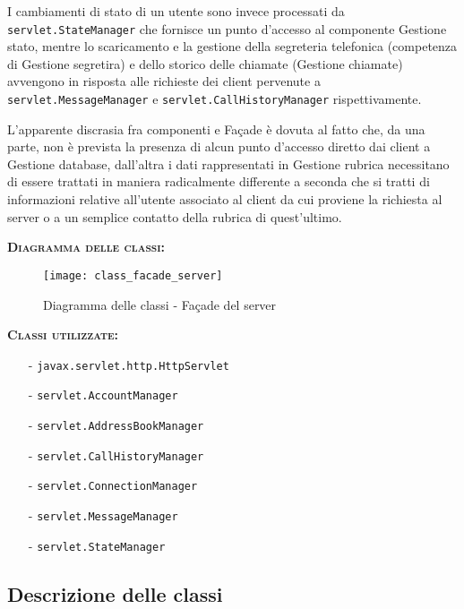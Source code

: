 \begin{description}
I cambiamenti di stato di un utente sono invece processati da \texttt{servlet.StateManager} che fornisce un punto d'accesso al componente \textsf{Gestione stato}, mentre lo scaricamento e la gestione della segreteria telefonica (competenza di \textsf{Gestione segretira}) e dello storico delle chiamate (\textsf{Gestione chiamate}) avvengono in risposta alle richieste dei client pervenute a \texttt{servlet.MessageManager} e \texttt{servlet.CallHistoryManager} rispettivamente.

L'apparente discrasia fra componenti e Façade è dovuta al fatto che, da una parte, non è prevista la presenza di alcun punto d'accesso diretto dai client a \textsf{Gestione database}, dall'altra i dati rappresentati in \textsf{Gestione rubrica} necessitano di essere trattati in maniera radicalmente differente a seconda che si tratti di informazioni relative all'utente associato al client da cui proviene la richiesta al server o a un semplice contatto della rubrica di quest'ultimo.

	\item{\scshape\bfseries Diagramma delle classi:}
\begin{figure}[H]
  \centering
  \texttt{[image: class\_facade\_server]}
  \caption{Diagramma delle classi - Façade del server}\label{fig:facadeserver}
\end{figure}	
	
	\item{\scshape\bfseries Classi utilizzate:}\\
	\begin{itemize}[noitemsep,nolistsep]
	  \item[-] \texttt{javax.servlet.http.HttpServlet}
	  \item[-] \texttt{servlet.AccountManager}
	  \item[-] \texttt{servlet.AddressBookManager}
	  \item[-] \texttt{servlet.CallHistoryManager}
	  \item[-] \texttt{servlet.ConnectionManager}
	  \item[-] \texttt{servlet.MessageManager}
	  \item[-] \texttt{servlet.StateManager}
	\end{itemize}
\end{description}

\subsection{Descrizione delle classi}

